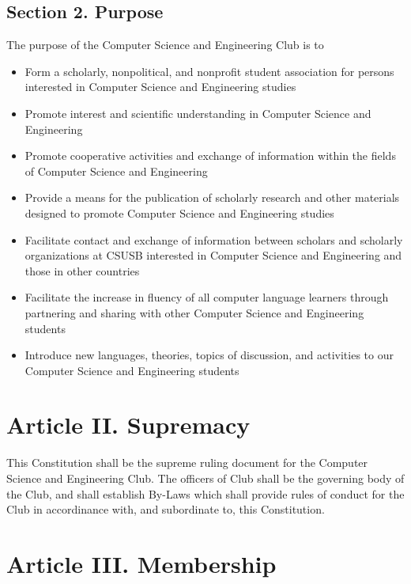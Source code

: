 \documentclass{article}
\begin{document}
  \subsection{Section 2. Purpose}
    The purpose of the Computer Science and Engineering Club is to
    \begin{itemize}
      \item Form a scholarly, nonpolitical, and nonprofit student association for persons interested in Computer Science and Engineering studies
      \item Promote interest and scientific understanding in Computer Science and Engineering
      \item Promote cooperative activities and exchange of information within the fields of Computer Science and Engineering
      \item Provide a means for the publication of scholarly research and other materials designed to promote Computer Science and Engineering studies
      \item Facilitate contact and exchange of information between scholars and scholarly organizations at CSUSB interested in Computer Science and Engineering and those in other countries
      \item Facilitate the increase in fluency of all computer language learners through partnering and sharing with other Computer Science and Engineering students
      \item Introduce new languages, theories, topics of discussion, and activities to our Computer Science and Engineering students
    \end{itemize}

\section{Article II. Supremacy}
  This Constitution shall be the supreme ruling document for the Computer Science and Engineering Club. The officers of Club shall be the governing body of the Club, and shall establish By-Laws which shall provide rules of conduct for the Club in accordinance with, and subordinate to, this Constitution.

\section{Article III. Membership}
\end{document}
